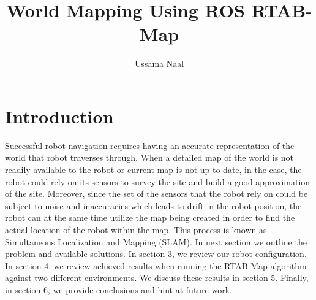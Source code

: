 \documentclass[10pt,journal,compsoc]{IEEEtran}
\begin{document}
\title{World Mapping Using ROS RTAB-Map}

\author{Ussama Naal}

%
{}


\maketitle
\IEEEdisplaynontitleabstractindextext
\IEEEpeerreviewmaketitle
\section{Introduction}
\label{sec:introduction}


\IEEEPARstart Successful robot navigation requires having an accurate representation of the world that robot traverses through. When a detailed map of the world is not readily available to the robot or current map is not up to date, in the case, the robot could rely on its sensors to survey the site and build a good approximation of the site. Moreover, since the set of the sensors that the robot rely on could be subject to noise and inaccuracies which leads to drift in the robot position, the robot can at the same time utilize the map being created in order to find the actual location of the robot within the map. This process is known as Simultaneous Localization and Mapping (SLAM). In next section we outline the problem and available solutions. In section 3, we review our robot configuration. In section 4, we review achieved results when running the RTAB-Map algorithm against two different environments. We discuss these results in section 5. Finally, in section 6, we provide conclusions and hint at future work.
\end{document}
